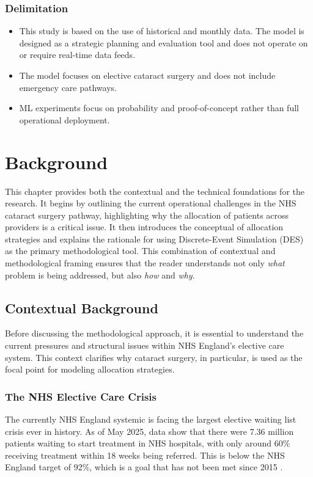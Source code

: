 \documentclass[ %
                    author={Nattanan Nawakitbamrung},
                supervisor={Dr. Sébastien Rochat},
                    degree={MSc},
                     title={Developing and Evaluating the Impact of a Single Patient Treatment List (PTL) for an NHS Integrated Care System},
                  subtitle={},
                      type={},
                      year={2025}]{dissertation}
\begin{document}
\noindent
\subsection{Delimitation}
\begin{itemize}
    \item This study is based on the use of historical and monthly data. The model is designed as a strategic planning and evaluation tool and does not operate on or require real-time data feeds.
    \item The model focuses on elective cataract surgery and does not include emergency care pathways.
    \item ML experiments focus on probability and proof-of-concept rather than full operational deployment.
\end{itemize}


\chapter{Background}
\label{chap:background}

\vspace{1cm} 

\noindent
This chapter provides both the contextual and the technical foundations for the research. 
It begins by outlining the current operational challenges in the NHS cataract surgery pathway, highlighting why the allocation of patients across providers is a critical issue. It then introduces the conceptual of allocation strategies and explains the rationale for using Discrete-Event Simulation (DES) as the primary methodological tool. This combination of contextual and methodological framing ensures that the reader understands not only \emph{what} problem is being addressed, but also \emph{how} and \emph{why}.

\section{Contextual Background}

Before discussing the methodological approach, it is essential to understand the current pressures and structural issues within NHS England’s elective care system. This context clarifies why cataract surgery, in particular, is used as the focal point for modeling allocation strategies.

\subsection{The NHS Elective Care Crisis}
The currently NHS England systemic is facing the largest elective waiting list crisis ever in history. As of May 2025, data show that there were 7.36 million patients waiting to start treatment in NHS hospitals, with only around 60\% receiving treatment within 18 weeks being referred. This is below the NHS England target of 92\%, which is a goal that has not been met since 2015 \cite{nhs2024guide, nuffield2024dashboard, kingsfund2024}.
\end{document}
